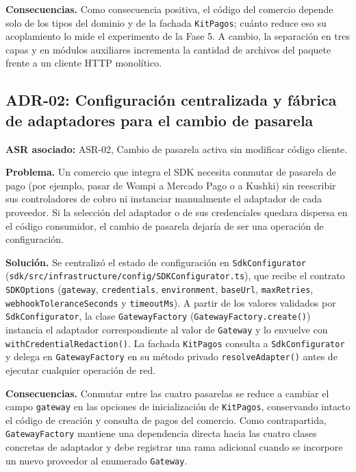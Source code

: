 \textbf{Consecuencias.} Como consecuencia positiva, el código del comercio depende solo de los tipos del dominio y de la fachada \texttt{KitPagos}; cuánto reduce eso su acoplamiento lo mide el experimento de la Fase 5. A cambio, la separación en tres capas y en módulos auxiliares incrementa la cantidad de archivos del paquete frente a un cliente HTTP monolítico.

\subsection{ADR-02: Configuración centralizada y fábrica de adaptadores para el cambio de pasarela}
\textbf{ASR asociado:} ASR-02, Cambio de pasarela activa sin modificar código cliente.

\textbf{Problema.} Un comercio que integra el SDK necesita conmutar de pasarela de pago (por ejemplo, pasar de Wompi a Mercado Pago o a Kushki) sin reescribir sus controladores de cobro ni instanciar manualmente el adaptador de cada proveedor. Si la selección del adaptador o de sus credenciales quedara dispersa en el código consumidor, el cambio de pasarela dejaría de ser una operación de configuración.

\textbf{Solución.} Se centralizó el estado de configuración en \texttt{SdkConfigurator} (\texttt{sdk/\allowbreak{}src/\allowbreak{}infrastructure/\allowbreak{}config/\allowbreak{}SDKConfigurator.ts}), que recibe el contrato \texttt{SDKOptions} (\texttt{gateway}, \texttt{credentials}, \texttt{environment}, \texttt{baseUrl}, \texttt{maxRetries}, \texttt{webhookToleranceSeconds} y \texttt{timeoutMs}). A partir de los valores validados por \texttt{SdkConfigurator}, la clase \texttt{GatewayFactory} (\texttt{GatewayFactory.\allowbreak{}create()}) instancia el adaptador correspondiente al valor de \texttt{Gateway} y lo envuelve con \texttt{withCredentialRedaction()}. La fachada \texttt{KitPagos} consulta a \texttt{SdkConfigurator} y delega en \texttt{GatewayFactory} en su método privado \texttt{resolveAdapter()} antes de ejecutar cualquier operación de red.

\textbf{Consecuencias.} Conmutar entre las cuatro pasarelas se reduce a cambiar el campo \texttt{gateway} en las opciones de inicialización de \texttt{KitPagos}, conservando intacto el código de creación y consulta de pagos del comercio. Como contrapartida, \texttt{GatewayFactory} mantiene una dependencia directa hacia las cuatro clases concretas de adaptador y debe registrar una rama adicional cuando se incorpore un nuevo proveedor al enumerado \texttt{Gateway}.


